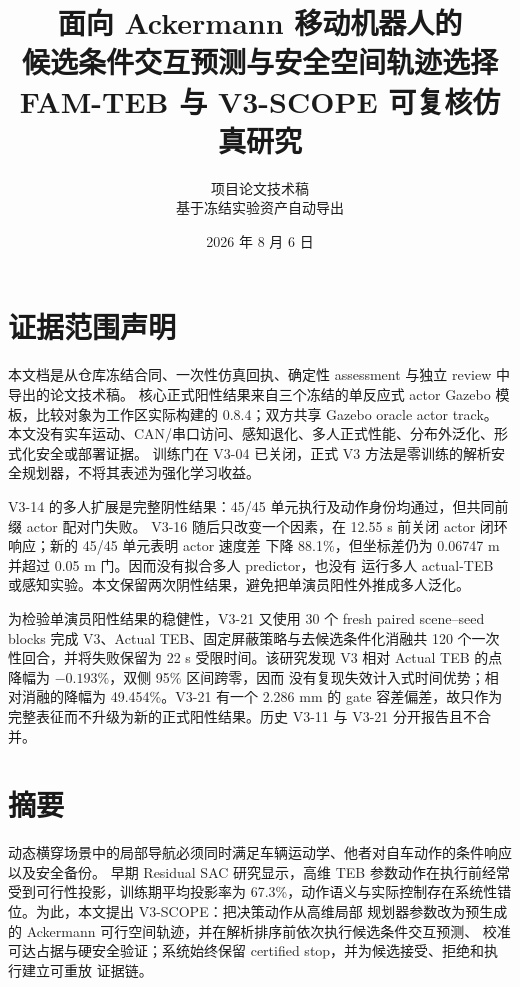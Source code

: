 \documentclass[12pt,a4paper,oneside]{report}
\title{\Huge 面向 Ackermann 移动机器人的\\候选条件交互预测与安全空间轨迹选择\\[0.8em]\Large FAM-TEB 与 V3-SCOPE 可复核仿真研究}
\author{项目论文技术稿\\\small 基于冻结实验资产自动导出}
\date{2026 年 8 月 6 日}
\begin{document}
\maketitle

\chapter*{证据范围声明}
本文档是从仓库冻结合同、一次性仿真回执、确定性 assessment 与独立 review 中导出的论文技术稿。
核心正式阳性结果来自三个冻结的单反应式 actor Gazebo 模板，比较对象为工作区实际构建的
 0.8.4；双方共享 Gazebo oracle actor track。
本文没有实车运动、CAN/串口访问、感知退化、多人正式性能、分布外泛化、形式化安全或部署证据。
训练门在 V3-04 已关闭，正式 V3 方法是零训练的解析安全规划器，不将其表述为强化学习收益。

V3-14 的多人扩展是完整阴性结果：45/45 单元执行及动作身份均通过，但共同前缀 actor 配对门失败。
V3-16 随后只改变一个因素，在 12.55 s 前关闭 actor 闭环响应；新的 45/45 单元表明 actor 速度差
下降 88.1\%，但坐标差仍为 0.06747 m 并超过 0.05 m 门。因而没有拟合多人 predictor，也没有
运行多人 actual-TEB 或感知实验。本文保留两次阴性结果，避免把单演员阳性外推成多人泛化。

为检验单演员阳性结果的稳健性，V3-21 又使用 30 个 fresh paired scene--seed blocks 完成
V3、Actual TEB、固定屏蔽策略与去候选条件化消融共 120 个一次性回合，并将失败保留为 22 s
受限时间。该研究发现 V3 相对 Actual TEB 的点降幅为 $-0.193\%$，双侧 95\% 区间跨零，因而
没有复现失效计入式时间优势；相对消融的降幅为 49.454\%。V3-21 有一个 2.286 mm 的 gate
容差偏差，故只作为完整表征而不升级为新的正式阳性结果。历史 V3-11 与 V3-21 分开报告且不合并。

\chapter*{摘要}
动态横穿场景中的局部导航必须同时满足车辆运动学、他者对自车动作的条件响应以及安全备份。
早期 Residual SAC 研究显示，高维 TEB 参数动作在执行前经常受到可行性投影，训练期平均投影率为
67.3\%，动作语义与实际控制存在系统性错位。为此，本文提出 V3-SCOPE：把决策动作从高维局部
规划器参数改为预生成的 Ackermann 可行空间轨迹，并在解析排序前依次执行候选条件交互预测、
校准可达占据与硬安全验证；系统始终保留 certified stop，并为候选接受、拒绝和执行建立可重放
证据链。
\end{document}
